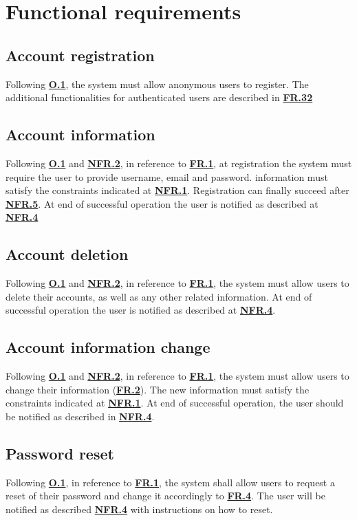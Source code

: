 \documentclass[12pt]{article}
\renewcommand\bf[1]{\textbf{#1}}
\newcommand\hyl[1]{\hyperref[#1]{\bf{#1}}}
\begin{document}
\section{Functional requirements}
\subsection{Account registration} \label{FR.1}
Following \hyl{O.1}, the system must allow anonymous users to register.
The additional functionalities for authenticated users are described in \hyl{FR.32}

\subsection{Account information} \label{FR.2}
Following \hyl{O.1} and \hyl{NFR.2}, in reference to \hyl{FR.1}, at registration the system must require the user to provide username, email and password. information must satisfy the constraints indicated at \hyl{NFR.1}.
Registration can finally succeed after \hyl{NFR.5}. At end of successful operation the user is notified as described at \hyl{NFR.4}

\subsection{Account deletion} \label{FR.3}
Following \hyl{O.1} and \hyl{NFR.2}, in reference to \hyl{FR.1}, the system must allow users to delete their accounts, as well as any other related information. At end of successful operation the user is notified
as described at \hyl{NFR.4}.

\subsection{Account information change} \label{FR.4}
Following \hyl{O.1} and \hyl{NFR.2}, in reference to \hyl{FR.1}, the system must allow users to change their information (\hyl{FR.2}).
The new information must satisfy the constraints indicated at \hyl{NFR.1}. At end of successful operation, the user should be notified as described in \hyl{NFR.4}.

\subsection{Password reset} \label{FR.5}
Following \hyl{O.1}, in reference to \hyl{FR.1}, the system shall allow users to request a reset of their password and change it accordingly to \hyl{FR.4}.
The user will be notified as described \hyl{NFR.4} with instructions on how to reset.
\end{document}
